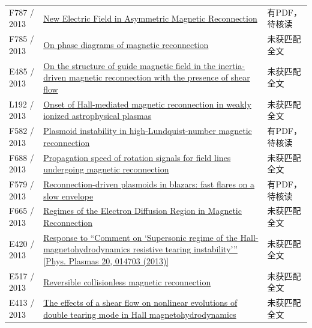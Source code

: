 \documentclass[UTF8,a4paper,11pt,openany,fontset=fandol]{ctexbook}
\begin{document}
\begin{longtable}{P{24mm}P{97mm}P{27mm}}
F787 / 2013 & \href{https://doi.org/10.1103/physrevlett.111.135001}{New Electric Field in Asymmetric Magnetic Reconnection} & 有PDF，待核读\\

F785 / 2013 & \href{https://doi.org/10.1063/1.4811120}{On phase diagrams of magnetic reconnection} & 未获匹配全文\\

E485 / 2013 & \href{https://doi.org/10.1063/1.4829039}{On the structure of guide magnetic field in the inertia-driven magnetic reconnection with the presence of shear flow} & 未获匹配全文\\

L192 / 2013 & \href{https://doi.org/10.1093/mnras/stt1155}{Onset of Hall-mediated magnetic reconnection in weakly ionized astrophysical plasmas} & 未获匹配全文\\

F582 / 2013 & \href{https://doi.org/10.1063/1.4802941}{Plasmoid instability in high-Lundquist-number magnetic reconnection} & 有PDF，待核读\\

F688 / 2013 & \href{https://doi.org/10.1063/1.4825132}{Propagation speed of rotation signals for field lines undergoing magnetic reconnection} & 未获匹配全文\\

F579 / 2013 & \href{https://doi.org/10.1093/mnras/stt167}{Reconnection-driven plasmoids in blazars: fast flares on a slow envelope} & 有PDF，待核读\\

F665 / 2013 & \href{https://doi.org/10.1103/physrevlett.110.135004}{Regimes of the Electron Diffusion Region in Magnetic Reconnection} & 未获匹配全文\\

E420 / 2013 & \href{https://doi.org/10.1063/1.4789450}{Response to “Comment on ‘Supersonic regime of the Hall-magnetohydrodynamics resistive tearing instability’” [Phys. Plasmas 20,  014703 (2013)]} & 未获匹配全文\\

E517 / 2013 & \href{https://doi.org/10.1063/1.4826201}{Reversible collisionless magnetic reconnection} & 未获匹配全文\\

E413 / 2013 & \href{https://doi.org/10.1016/j.physleta.2013.07.014}{The effects of a shear flow on nonlinear evolutions of double tearing mode in Hall magnetohydrodynamics} & 未获匹配全文\\


\end{longtable}
\end{document}
